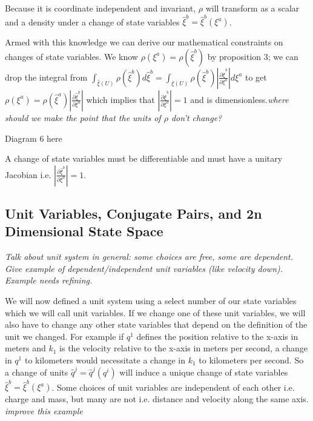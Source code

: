 \documentclass{article}
\begin{document}
\begin{prop}
	Because it is coordinate independent and invariant, $\rho$ will transform as a scalar and a density under a change of state variables $\hat{\xi}^b = \hat{\xi}^b(\xi^a)$.
\end{prop}

	Armed with this knowledge we can derive our mathematical constraints on changes of state variables. We know $\rho(\xi^a) = \rho(\hat{\xi}^b)$ by proposition 3; we can drop the integral from $\int_{\hat{\xi}(U)} \rho(\hat{\xi}^b)d\hat{\xi}^b = \int_{\xi(U)} \rho(\hat{\xi}^b)\left|\frac{\partial\hat{\xi}^b}{\partial\xi^a}\right|d\xi^a$ to get $\rho(\xi^a) = \rho(\hat{\xi}^a)\left|\frac{\partial\hat{\xi}^b}{\partial\xi^a}\right|$ which implies that $\left|\frac{\partial\hat{\xi}^b}{\partial\xi^a}\right| = 1$ and is dimensionless.\emph{where should we make the point that the units of $\rho$ don't change?}
	
Diagram 6 here
	
\begin{prop}
	A change of state variables must be differentiable and must have a unitary Jacobian i.e. $\left|\frac{\partial\hat{\xi}^b}{\partial\xi^a}\right| = 1$.
\end{prop}

\subsection{Unit Variables, Conjugate Pairs, and 2n Dimensional State Space}

\emph{Talk about unit system in general: some choices are free, some are dependent. Give example of dependent/independent unit variables (like velocity down). Example needs refining.}

	We will now defined a unit system using a select number of our state variables which we will call unit variables. If we change one of these unit variables, we will also have to change any other state variables that depend on the definition of the unit we changed. For example if $q^1$ defines the position relative to the x-axis in meters and $k_1$ is the velocity relative to the x-axis in meters per second, a change in $q^1$ to kilometers would necessitate a change in $k_1$ to kilometers per second. So a change of units $\hat{q}^j = \hat{q}^j(q^i)$ will induce a unique change of state variables $\hat{\xi}^b = \hat{\xi}^b(\xi^a)$. Some choices of unit variables are independent of each other i.e. charge and mass, but many are not i.e. distance and velocity along the same axis. \emph{improve this example}
\end{document}
